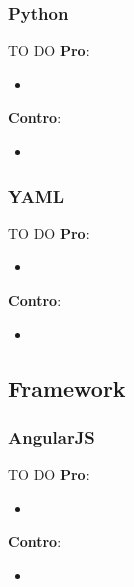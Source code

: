 		\subsubsection{Python} %
		\label{sub:python}
		TO DO \newline
		\textbf{Pro}:
			\begin{itemize}
				\item 
			\end{itemize}
		\noindent
		\newline
		\textbf{Contro}:
			\begin{itemize}
				\item 
			\end{itemize}
			\noindent

		\subsubsection{YAML} %
		\label{ssub:yaml}
		TO DO \newline
		\textbf{Pro}:
			\begin{itemize}
				\item 
			\end{itemize}
		\noindent
		\newline
		\textbf{Contro}:
			\begin{itemize}
				\item 
			\end{itemize}
			\noindent


	\subsection{Framework} %
	\label{sub:framework}
		\subsubsection{AngularJS} %
		\label{ssub:angularjs}
		TO DO \newline
		\textbf{Pro}:
			\begin{itemize}
				\item 
			\end{itemize}
		\noindent
		\newline
		\textbf{Contro}:
			\begin{itemize}
				\item 
			\end{itemize}
			\noindent

